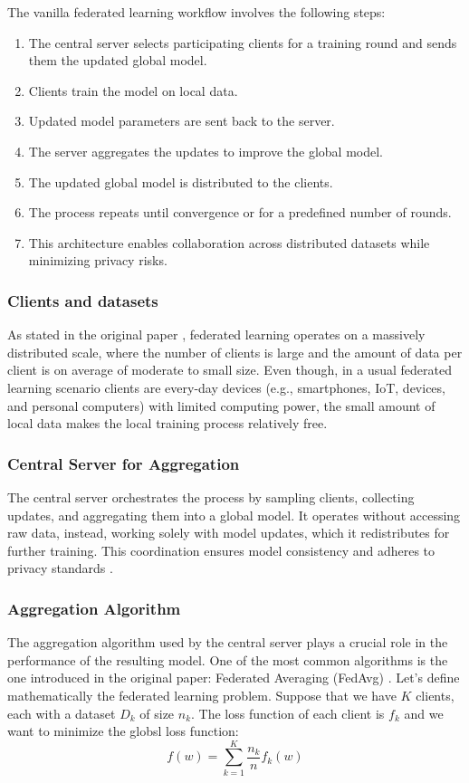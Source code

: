 The vanilla federated learning workflow involves the following steps:
\begin{enumerate}
  \item  The central server selects participating clients for a training round and sends them the updated global model.
  \item  Clients train the model on local data.
  \item  Updated model parameters are sent back to the server.
  \item  The server aggregates the updates to improve the global model.
  \item  The updated global model is distributed to the clients.
  \item  The process repeats until convergence or for a predefined number of rounds.
  \item  This architecture enables collaboration across distributed datasets while minimizing privacy risks.
\end{enumerate}

\subsubsection{Clients and datasets} \label{sec:clients-and-datasets}
As stated in the original paper \cite{McMahan2016}, federated learning operates on a massively distributed
scale, where the number of clients
is large and the amount of data per client is on average of moderate to small size.
Even though, in a usual federated learning scenario clients are every-day devices (e.g., smartphones, IoT,
devices, and personal computers)
with limited computing power, the small amount of local data makes the local training process relatively free.

\subsubsection{Central Server for Aggregation}
The central server orchestrates the process by sampling clients, collecting updates, and aggregating them
into a global model.
It operates without accessing raw data, instead, working solely with model updates, which it redistributes
for further training.
This coordination ensures model consistency and adheres to privacy standards \cite{Li2020}.

\subsubsection{Aggregation Algorithm}
The aggregation algorithm used by the central server plays a crucial role in the performance of the resulting model.
One of the most common algorithms is the one introduced in the original paper: Federated Averaging (FedAvg)
\cite{McMahan2016}.
Let's define mathematically the federated learning problem.
Suppose that we have \(K\) clients, each with a dataset \(D_k\) of size \(n_k\). The loss function of each
client is \(f_k\) and we want to minimize the globsl loss function:
\[
  f(w) = \sum_{k=1}^{K} \frac{n_k}{n} f_k(w)
\]


